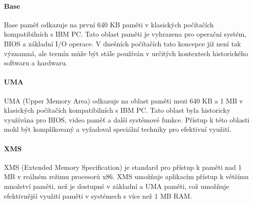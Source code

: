 \paragraph{Base}
Base paměť odkazuje na první 640 KB paměti v klasických počítačích kompatibilních s IBM PC. Tato oblast paměti je vyhrazena pro operační systém, BIOS a základní I/O operace. V dnešních počítačích tato koncepce již není tak významná, ale termín může být stále používán v určitých kontextech historického softwaru a hardwaru.

\paragraph{UMA}
UMA (Upper Memory Area) odkazuje na oblast paměti mezi 640 KB a 1 MB v klasických počítačích kompatibilních s IBM PC. Tato oblast byla historicky využívána pro BIOS, video paměť a další systémové funkce. Přístup k této oblasti mohl být komplikovaný a vyžadoval speciální techniky pro efektivní využití.

\paragraph{XMS}
XMS (Extended Memory Specification) je standard pro přístup k paměti nad 1 MB v reálném režimu procesorů x86. XMS umožňuje aplikacím přístup k většímu množství paměti, než je dostupné v základní a UMA paměti, což umožňuje efektivnější využití paměti v systémech s více než 1 MB RAM.